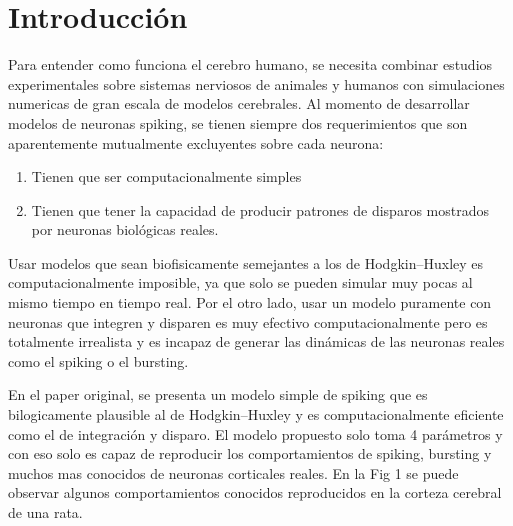 \documentclass[12pt]{article}
\begin{document}
\section{Introducción}
Para entender como funciona el cerebro humano, se necesita combinar estudios experimentales sobre sistemas nerviosos de animales y humanos con simulaciones numericas de gran escala de modelos cerebrales.
Al momento de desarrollar modelos de neuronas spiking, se tienen siempre dos requerimientos que son aparentemente mutualmente excluyentes sobre cada neurona:
\begin{enumerate}
    \item Tienen que ser computacionalmente simples
    \item Tienen que tener la capacidad de producir patrones de disparos mostrados por neuronas biológicas reales.
\end{enumerate}

Usar modelos que sean biofisicamente semejantes a los de Hodgkin–Huxley es computacionalmente imposible, ya que solo se pueden simular muy pocas al mismo tiempo en tiempo real. Por el otro lado, usar un modelo
puramente con neuronas que integren y disparen es muy efectivo computacionalmente pero es totalmente irrealista y es incapaz de generar las dinámicas de las neuronas reales como el spiking o el bursting.

En el paper original, se presenta un modelo simple de spiking que es bilogicamente plausible al de Hodgkin–Huxley y es computacionalmente eficiente como el de integración y disparo.
El modelo propuesto solo toma 4 parámetros y con eso solo es capaz de reproducir los comportamientos de spiking, bursting y muchos mas conocidos de neuronas corticales reales. En la Fig 1 se puede observar
algunos comportamientos conocidos reproducidos en la corteza cerebral de una rata. \\ \\

\newpage
\end{document}
